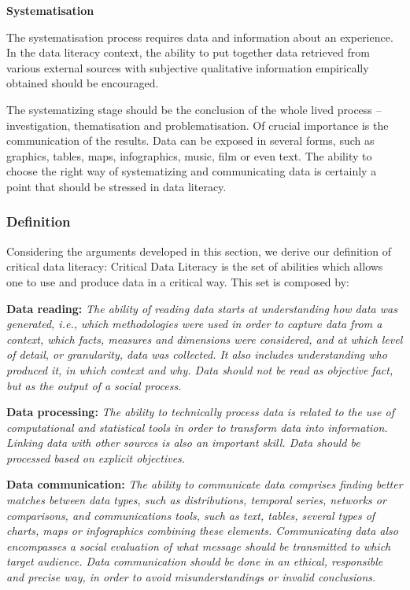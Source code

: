 \noindent \textbf{Systematisation}

The systematisation process requires data and information about an experience. In the data literacy context, the ability to put together data retrieved from various external sources with subjective qualitative information empirically obtained should be encouraged.

The systematizing stage should be the conclusion of the whole lived process – investigation, thematisation and problematisation. Of crucial importance is the communication of the results. Data can be exposed in several forms, such as graphics, tables, maps, infographics, music, film or even text. The ability to choose the right way of systematizing and communicating data is certainly a point that should be stressed in data literacy. 

\subsubsection{Definition}

Considering the arguments developed in this section, we derive our definition of critical data literacy:
Critical Data Literacy is the set of abilities which allows one to use and produce data in a critical way. This set is composed by:

\noindent \textbf{Data reading:} \emph{The ability of reading data starts at understanding how data was generated, i.e., which methodologies were used in order to capture data from a context, which facts, measures and dimensions were considered, and at which level of detail, or granularity, data was collected. It also includes understanding who produced it, in which context and why. Data should not be read as objective fact, but as the output of a social process.}

\noindent \textbf{Data processing:} \emph{The ability to technically process data is related to the use of computational and statistical tools in order to transform data into information. Linking data with other sources is also an important skill. Data should be processed based on explicit objectives.}

\noindent \textbf{Data communication:} \emph{The ability to communicate data comprises finding better matches between data types, such as distributions, temporal series, networks or comparisons, and communications tools, such as text, tables, several types of charts, maps or infographics combining these elements. Communicating data also encompasses a social evaluation of what message should be transmitted to which target audience. Data communication should be done in an ethical, responsible and precise way, in order to avoid misunderstandings or invalid conclusions.}

